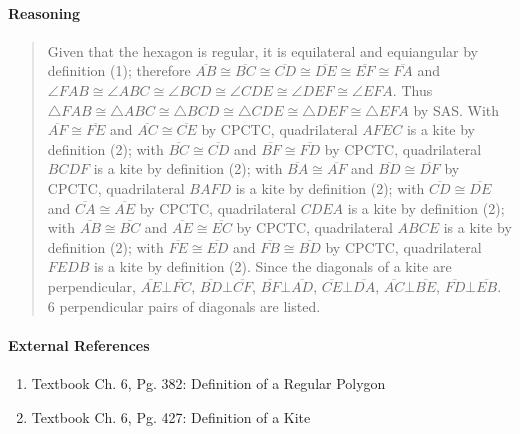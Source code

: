 \documentclass[letterpaper,12pt,twoside]{report}
\begin{document}
	\paragraph{Reasoning}
	\begin{quotation}
	
	Given that the hexagon is regular, it is equilateral and equiangular by definition (1); therefore $\overline{AB}\cong\overline{BC}\cong\overline{CD}\cong\overline{DE}\cong\overline{EF}\cong\overline{FA}$ and $\angle FAB\cong\angle ABC\cong\angle BCD\cong\angle CDE\cong\angle DEF\cong\angle EFA$. Thus $\triangle FAB\cong\triangle ABC\cong\triangle BCD\cong\triangle CDE\cong\triangle DEF\cong\triangle EFA$ by SAS. With $\overline{AF}\cong\overline{FE}$ and $\overline{AC}\cong\overline{CE}$ by CPCTC, quadrilateral $AFEC$ is a kite by definition (2); with $\overline{BC}\cong\overline{CD}$ and $\overline{BF}\cong\overline{FD}$ by CPCTC, quadrilateral $BCDF$ is a kite by definition (2); with $\overline{BA}\cong\overline{AF}$ and $\overline{BD}\cong\overline{DF}$ by CPCTC, quadrilateral $BAFD$ is a kite by definition (2); with $\overline{CD}\cong\overline{DE}$ and $\overline{CA}\cong\overline{AE}$ by CPCTC, quadrilateral $CDEA$ is a kite by definition (2); with $\overline{AB}\cong\overline{BC}$ and $\overline{AE}\cong\overline{EC}$ by CPCTC, quadrilateral $ABCE$ is a kite by definition (2); with $\overline{FE}\cong\overline{ED}$ and $\overline{FB}\cong\overline{BD}$ by CPCTC, quadrilateral $FEDB$ is a kite by definition (2). Since the diagonals of a kite are perpendicular, $\overline{AE}\bot\overline{FC}$, $\overline{BD}\bot\overline{CF}$, $\overline{BF}\bot\overline{AD}$, $\overline{CE}\bot\overline{DA}$, $\overline{AC}\bot\overline{BE}$, $\overline{FD}\bot\overline{EB}$. $\boxed{6}$ perpendicular pairs of diagonals are listed.
	
	\end{quotation}
	
	\paragraph{External References}
	
	\begin{enumerate}
		\item Textbook Ch. 6, Pg. 382: Definition of a Regular Polygon
		\item Textbook Ch. 6, Pg. 427: Definition of a Kite
	\end{enumerate}
\end{document}
